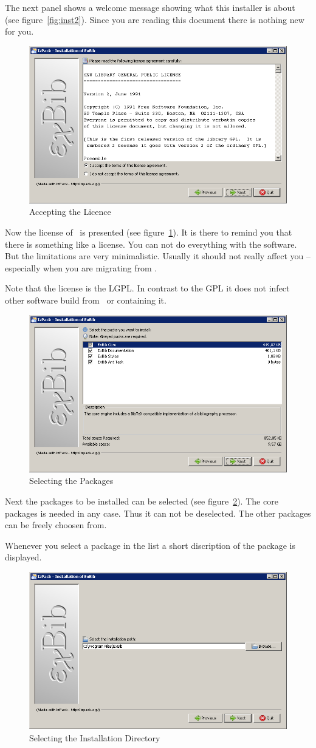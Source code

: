 The next panel shows a welcome message showing what this installer is
about (see figure~\ref{fig:inst2}). Since you are reading this
document there is nothing new for you.

\begin{figure}[!ht]
  \centering
  \includegraphics[width=.45\textwidth]{img/inst4}
  \caption{Accepting the Licence}
  \label{fig:inst3}
\end{figure}

Now the license of \ExBib\ is presented (see
figure~\ref{fig:inst3}). It is there to remind you that there is
something like a license. You can not do everything with the software.
But the limitations are very minimalistic. Usually it should not
really affect you -- especially when you are migrating from \BibTeX.

Note that the license is the LGPL. In
contrast to the GPL it does not infect
other software build from \ExBib\ or containing it.

\begin{figure}[!ht]
  \centering
  \includegraphics[width=.45\textwidth]{img/inst5}
  \caption{Selecting the Packages}
  \label{fig:inst4}
\end{figure}

Next the packages to be installed can be selected (see
figure~\ref{fig:inst4}). The core packages is needed in any case. Thus
it can not be deselected. The other packages can be freely choosen
from.

Whenever you select a package in the list a short discription of the
package is displayed.

\begin{figure}[!ht]
  \centering
  \includegraphics[width=.45\textwidth]{img/inst6}
  \caption{Selecting the Installation Directory}
  \label{fig:inst5}
\end{figure}

